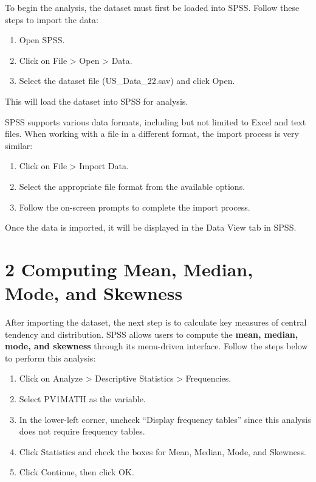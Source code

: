 \documentclass[
  letterpaper,
  DIV=11,
  numbers=noendperiod]{scrreprt}
\begin{document}

To begin the analysis, the dataset must first be loaded into SPSS.
Follow these steps to import the data:

\begin{enumerate}
\def\labelenumi{\arabic{enumi}.}
\item
  Open SPSS.
\item
  Click on File \textgreater{} Open \textgreater{} Data.
\item
  Select the dataset file (US\_Data\_22.sav) and click Open.
\end{enumerate}

This will load the dataset into SPSS for analysis.

SPSS supports various data formats, including but not limited to Excel
and text files. When working with a file in a different format, the
import process is very similar:

\begin{enumerate}
\def\labelenumi{\arabic{enumi}.}
\item
  Click on File \textgreater{} Import Data.
\item
  Select the appropriate file format from the available options.
\item
  Follow the on-screen prompts to complete the import process.
\end{enumerate}

Once the data is imported, it will be displayed in the Data View tab in
SPSS.

\section*{2 Computing Mean, Median, Mode, and
Skewness}\label{computing-mean-median-mode-and-skewness}


After importing the dataset, the next step is to calculate key measures
of central tendency and distribution. SPSS allows users to compute the
\textbf{mean, median, mode, and skewness} through its menu-driven
interface. Follow the steps below to perform this analysis:

\begin{enumerate}
\def\labelenumi{\arabic{enumi}.}
\item
  Click on Analyze \textgreater{} Descriptive Statistics \textgreater{}
  Frequencies.
\item
  Select PV1MATH as the variable.
\item
  In the lower-left corner, uncheck ``Display frequency tables'' since
  this analysis does not require frequency tables.
\item
  Click Statistics and check the boxes for Mean, Median, Mode, and
  Skewness.
\item
  Click Continue, then click OK.
\end{enumerate}
\end{document}
